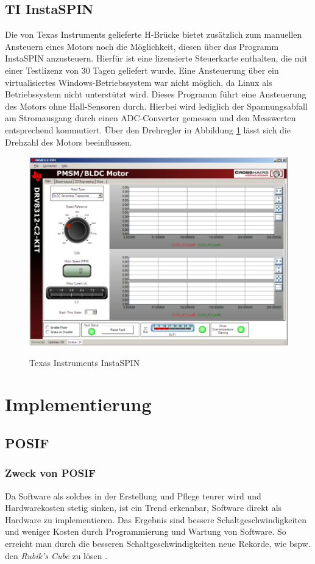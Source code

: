 \subsection{TI InstaSPIN}
Die von Texas Instruments gelieferte H-Brücke bietet zusätzlich zum manuellen Ansteuern eines Motors noch die Möglichkeit, diesen über das Programm InstaSPIN anzusteuern. Hierfür ist eine lizensierte Steuerkarte enthalten, die mit einer Testlizenz von 30 Tagen geliefert wurde. Eine Ansteuerung über ein virtualisiertes Windows-Betriebssystem war nicht möglich, da Linux als Betriebssystem nicht unterstützt wird. Dieses Programm führt eine Ansteuerung des Motors ohne Hall-Sensoren durch. Hierbei wird lediglich der Spannungsabfall am Stromausgang durch einen ADC-Converter gemessen und den Messwerten entsprechend kommutiert. Über den Drehregler in Abbildung \ref{fig:InstaSPIN} lässt sich die Drehzahl des Motors beeinflussen.
\begin{figure}
    \includegraphics[width=\textwidth]{motor/InstaSPIN}
    \caption{Texas Instruments InstaSPIN}
    \quelle \cite{Instruments2011}
    \label{fig:InstaSPIN}
\end{figure}
\section{Implementierung}
\subsection{POSIF}
\subsubsection{Zweck von POSIF}
Da Software als solches in der Erstellung und Pflege teurer wird und Hardwarekosten stetig sinken, ist ein Trend erkennbar, Software direkt als Hardware zu implementieren. Das Ergebnis sind bessere Schaltgeschwindigkeiten und weniger Kosten durch Programmierung und Wartung von Software. So erreicht man durch die besseren Schaltgeschwindigkeiten neue Rekorde, wie bspw. den \emph{Rubik's Cube} zu lösen \cite{POSIF2016}.

